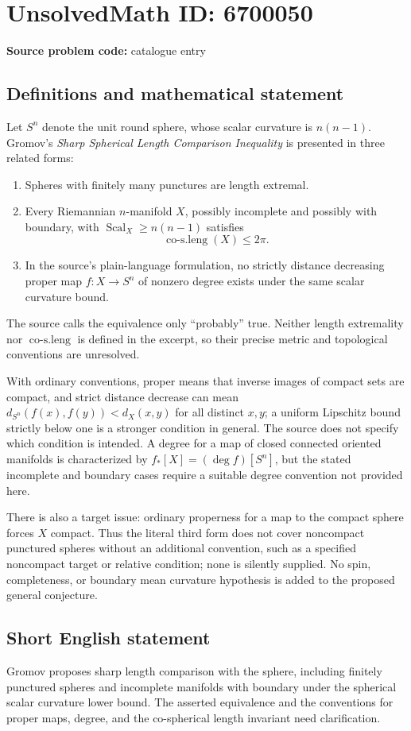 \documentclass[11pt]{article}
\begin{document}
\section*{UnsolvedMath ID: 6700050}
\textbf{Source problem code:} catalogue entry
\subsection{Definitions and mathematical statement}
Let \(S^n\) denote the unit round sphere, whose scalar curvature is \(n(n-1)\). Gromov's \emph{Sharp Spherical Length Comparison Inequality} is presented in three related forms:
\begin{enumerate}
\item Spheres with finitely many punctures are length extremal.
\item Every Riemannian \(n\)-manifold \(X\), possibly incomplete and possibly with boundary, with \(\operatorname{Scal}_X\geq n(n-1)\) satisfies
\[
 \operatorname{co\text{-}s.leng}(X)\leq2\pi.
\]
\item In the source's plain-language formulation, no strictly distance decreasing proper map \(f:X\to S^n\) of nonzero degree exists under the same scalar curvature bound.
\end{enumerate}
The source calls the equivalence only ``probably'' true. Neither length extremality nor \(\operatorname{co\text{-}s.leng}\) is defined in the excerpt, so their precise metric and topological conventions are unresolved.

With ordinary conventions, proper means that inverse images of compact sets are compact, and strict distance decrease can mean \(d_{S^n}(f(x),f(y))<d_X(x,y)\) for all distinct \(x,y\); a uniform Lipschitz bound strictly below one is a stronger condition in general. The source does not specify which condition is intended. A degree for a map of closed connected oriented manifolds is characterized by \(f_*[X]=(\deg f)[S^n]\), but the stated incomplete and boundary cases require a suitable degree convention not provided here.

There is also a target issue: ordinary properness for a map to the compact sphere forces \(X\) compact. Thus the literal third form does not cover noncompact punctured spheres without an additional convention, such as a specified noncompact target or relative condition; none is silently supplied. No spin, completeness, or boundary mean curvature hypothesis is added to the proposed general conjecture.
\subsection{Short English statement}
Gromov proposes sharp length comparison with the sphere, including finitely punctured spheres and incomplete manifolds with boundary under the spherical scalar curvature lower bound. The asserted equivalence and the conventions for proper maps, degree, and the co-spherical length invariant need clarification.
\end{document}
